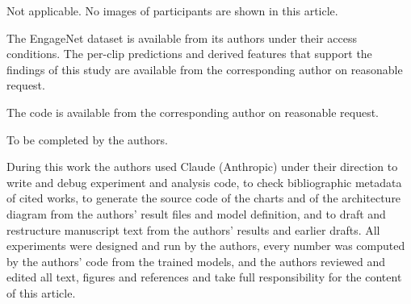 \documentclass[pdflatex,iicol,sn-basic]{sn-jnl}
\begin{document}
Not applicable. No images of participants are shown in this article.

The EngageNet dataset is available from its authors \citep{singh2023engagenet} under their access conditions. The per-clip predictions and derived features that support the findings of this study are available from the corresponding author on reasonable request.

The code is available from the corresponding author on reasonable request.

To be completed by the authors.

During this work the authors used Claude (Anthropic) under their direction to write and debug experiment and analysis code, to check bibliographic metadata of cited works, to generate the source code of the charts and of the architecture diagram from the authors' result files and model definition, and to draft and restructure manuscript text from the authors' results and earlier drafts. All experiments were designed and run by the authors, every number was computed by the authors' code from the trained models, and the authors reviewed and edited all text, figures and references and take full responsibility for the content of this article.
\end{document}
